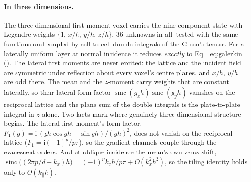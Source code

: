 \documentclass[extra,mreferee]{gji}
\newcommand{\sinc}{\operatorname{sinc}}
\begin{document}
\paragraph{In three dimensions.} The three-dimensional first-moment voxel carries the nine-component
state with Legendre weights $\{1,\,x/h,\,y/h,\,z/h\}$, 36 unknowns in all, tested with the same
functions and coupled by cell-to-cell double integrals of the Green's tensor. For a laterally uniform
layer at normal incidence it reduces \emph{exactly} to Eq.~\eqref{eq:galerkin}
(). The lateral first moments are never excited: the lattice and
the incident field are symmetric under reflection about every voxel's centre planes, and $x/h$, $y/h$
are odd there. The mean and the $z$-moment carry weights that are constant laterally, so their lateral
form factor $\sinc(g_xh)\sinc(g_yh)$ vanishes on the reciprocal lattice and the plane sum of the
double integrals is the plate-to-plate integral in $z$ alone. Two facts mark where genuinely
three-dimensional structure begins. The lateral first moment's form factor,
$F_1(g)=\mathrm{i}\,(gh\cos gh-\sin gh)/(gh)^2$, does not vanish on the reciprocal lattice
($F_1=\mathrm{i}(-1)^p/p\pi$), so the gradient channels couple through the evanescent orders. And at oblique
incidence the mean's own zeros shift, $\sinc\bigl((2\pi p/d+k_x)h\bigr)=(-1)^p k_xh/p\pi+O(k_x^2h^2)$,
so the tiling identity holds only to $O(k_\parallel h)$.
\end{document}
